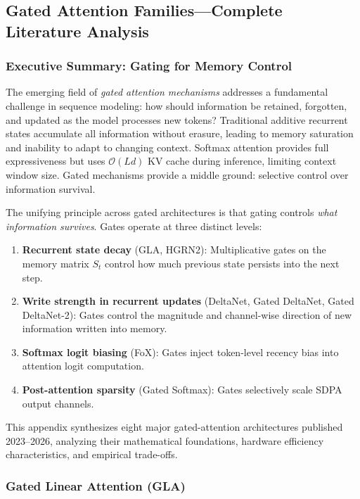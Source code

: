 \subsection{Gated Attention Families---Complete Literature Analysis}
\label{sec:annex-gated}

\subsubsection{Executive Summary: Gating for Memory Control}

The emerging field of \emph{gated attention mechanisms} addresses a fundamental challenge in sequence modeling: how should information be retained, forgotten, and updated as the model processes new tokens? Traditional additive recurrent states accumulate all information without erasure, leading to memory saturation and inability to adapt to changing context. Softmax attention provides full expressiveness but uses $\mathcal{O}(Ld)$ KV cache during inference, limiting context window size. Gated mechanisms provide a middle ground: selective control over information survival.

The unifying principle across gated architectures is that gating controls \textit{what information survives}. Gates operate at three distinct levels:
\begin{enumerate}[leftmargin=*]
    \item \textbf{Recurrent state decay} (GLA, HGRN2): Multiplicative gates on the memory matrix $S_t$ control how much previous state persists into the next step.
    \item \textbf{Write strength in recurrent updates} (DeltaNet, Gated DeltaNet, Gated DeltaNet-2): Gates control the magnitude and channel-wise direction of new information written into memory.
    \item \textbf{Softmax logit biasing} (FoX): Gates inject token-level recency bias into attention logit computation.
    \item \textbf{Post-attention sparsity} (Gated Softmax): Gates selectively scale SDPA output channels.
\end{enumerate}

This appendix synthesizes eight major gated-attention architectures published 2023--2026, analyzing their mathematical foundations, hardware efficiency characteristics, and empirical trade-offs.

\subsubsection{Gated Linear Attention (GLA)}

